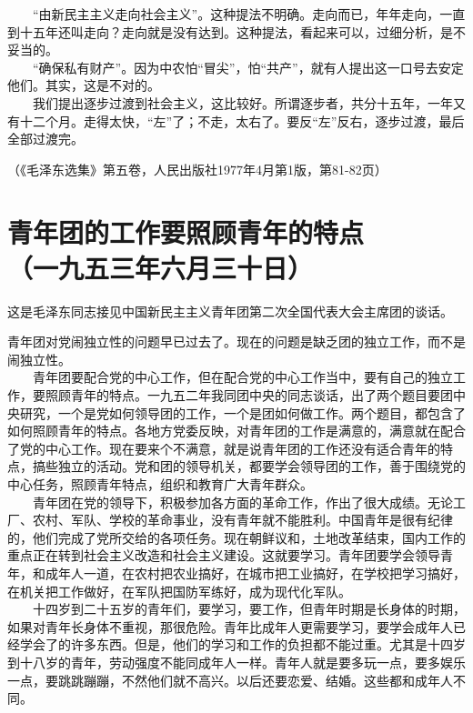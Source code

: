 \documentclass[cn,11pt,chinese]{elegantbook}
\def\myformat#1{\hfil\hfil #1}
\begin{document}
　　“由新民主主义走向社会主义”。这种提法不明确。走向而已，年年走向，一直到十五年还叫走向？走向就是没有达到。这种提法，看起来可以，过细分析，是不妥当的。\\
　　“确保私有财产”。因为中农怕“冒尖”，怕“共产”，就有人提出这一口号去安定他们。其实，这是不对的。\\
　　我们提出逐步过渡到社会主义，这比较好。所谓逐步者，共分十五年，一年又有十二个月。走得太快，“左”了；不走，太右了。要反“左”反右，逐步过渡，最后全部过渡完。\\
\begin{flushright}（《毛泽东选集》第五卷，人民出版社1977年4月第1版，第81-82页）\end{flushright}
\newpage\section*{\myformat{青年团的工作要照顾青年的特点}\\\myformat{（一九五三年六月三十日）}}
\begin{introduction}\item  这是毛泽东同志接见中国新民主主义青年团第二次全国代表大会主席团的谈话。\end{introduction}
青年团对党闹独立性的问题早已过去了。现在的问题是缺乏团的独立工作，而不是闹独立性。\\
　　青年团要配合党的中心工作，但在配合党的中心工作当中，要有自己的独立工作，要照顾青年的特点。一九五二年我同团中央的同志谈话，出了两个题目要团中央研究，一个是党如何领导团的工作，一个是团如何做工作。两个题目，都包含了如何照顾青年的特点。各地方党委反映，对青年团的工作是满意的，满意就在配合了党的中心工作。现在要来个不满意，就是说青年团的工作还没有适合青年的特点，搞些独立的活动。党和团的领导机关，都要学会领导团的工作，善于围绕党的中心任务，照顾青年特点，组织和教育广大青年群众。\\
　　青年团在党的领导下，积极参加各方面的革命工作，作出了很大成绩。无论工厂、农村、军队、学校的革命事业，没有青年就不能胜利。中国青年是很有纪律的，他们完成了党所交给的各项任务。现在朝鲜议和，土地改革结束，国内工作的重点正在转到社会主义改造和社会主义建设。这就要学习。青年团要学会领导青年，和成年人一道，在农村把农业搞好，在城市把工业搞好，在学校把学习搞好，在机关把工作做好，在军队把国防军练好，成为现代化军队。\\
　　十四岁到二十五岁的青年们，要学习，要工作，但青年时期是长身体的时期，如果对青年长身体不重视，那很危险。青年比成年人更需要学习，要学会成年人已经学会了的许多东西。但是，他们的学习和工作的负担都不能过重。尤其是十四岁到十八岁的青年，劳动强度不能同成年人一样。青年人就是要多玩一点，要多娱乐一点，要跳跳蹦蹦，不然他们就不高兴。以后还要恋爱、结婚。这些都和成年人不同。\\
\end{document}
